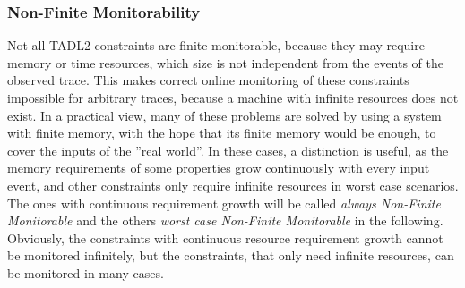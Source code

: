 			
	\subsubsection{Non-Finite Monitorability}
		Not all TADL2 constraints are finite monitorable, because they may require memory or time resources, which size is not independent from the events of the observed trace. This makes correct online monitoring of these constraints impossible for arbitrary traces, because a machine with infinite resources does not exist. In a practical view, many of these problems are solved by using a system with finite memory, with the hope that its finite memory would be enough, to cover the inputs of the ''real world''. In these cases, a distinction is useful, as the memory requirements of some properties grow continuously with every input event, and other constraints only require infinite resources in worst case scenarios. The ones with continuous requirement growth will be called \emph{always Non-Finite Monitorable} and the others \emph{worst case Non-Finite Monitorable} in the following.\\
		Obviously, the constraints with continuous resource requirement growth cannot be monitored infinitely, but the constraints, that only need infinite resources, can be monitored in many cases.

	 